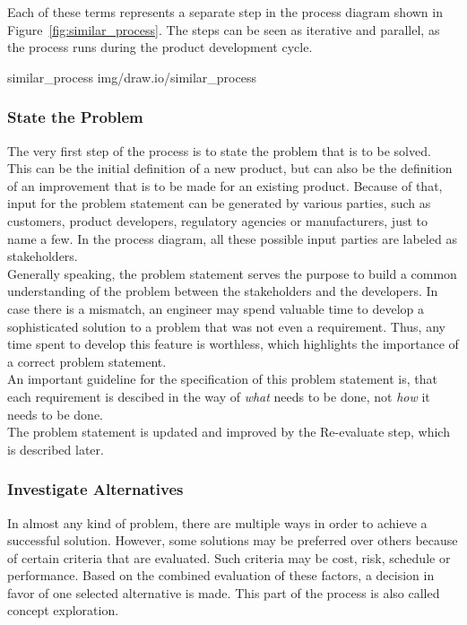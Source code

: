 Each of these terms represents a separate step in the process diagram shown in Figure~\ref{fig:similar_process}.
The steps can be seen as iterative and parallel, as the process runs during the product development cycle.

 {similar_process} {img/draw.io/similar_process}

\subsubsection{State the Problem}

\hspace{5mm} The very first step of the process is to state the problem that is to be solved.
This can be the initial definition of a new product, but can also be the definition of an improvement that is to be made for an existing product.
Because of that, input for the problem statement can be generated by various parties, such as customers, product developers, regulatory agencies or manufacturers, just to name a few.
In the process diagram, all these possible input parties are labeled as stakeholders.\\

Generally speaking, the problem statement serves the purpose to build a common understanding of the problem between the stakeholders and the developers.
In case there is a mismatch, an engineer may spend valuable time to develop a sophisticated solution to a problem that was not even a requirement.
Thus, any time spent to develop this feature is worthless, which highlights the importance of a correct problem statement.\\

An important guideline for the specification of this problem statement is, that each requirement is descibed in the way of \textit{what} needs to be done, not \textit{how} it needs to be done.\\

The problem statement is updated and improved by the Re-evaluate step, which is described later.

\subsubsection{Investigate Alternatives}

\hspace{5mm} In almost any kind of problem, there are multiple ways in order to achieve a successful solution.
However, some solutions may be preferred over others because of certain criteria that are evaluated.
Such criteria may be cost, risk, schedule or performance.
Based on the combined evaluation of these factors, a decision in favor of one selected alternative is made.
This part of the process is also called concept exploration.\\

